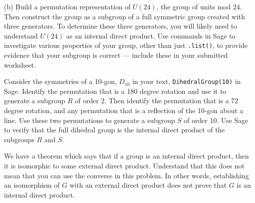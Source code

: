 %
(b) Build a permutation representation of $U(24)$, the group of units mod 24.  Then construct the group as a subgroup of a full symmetric group created with three generators.  To determine these three generators, you will likely need to understand $U(24)$ as an internal direct product.  Use commands in Sage to investigate various properties of your group, other than just \verb?.list()?, to provide evidence that your subgroup is correct --- include these in your submitted worksheet.
\begin{sageverbatim}\end{sageverbatim}
%
%
Consider the symmetries of a 10-gon, $D_{10}$ in your text, \verb?DihedralGroup(10)? in Sage.  Identify the permutation that is a 180 degree rotation and use it to generate a subgroup $R$ of order 2.  Then identify the permutation that is a 72 degree rotation, and any permutation that is a reflection of the 10-gon about a line.  Use these two permutations to generate a subgroup $S$ of order 10.  Use Sage to verify that the full dihedral group is the internal direct product of the subgroups $R$ and $S$.\par
%
We have a theorem which says that if a group is an internal direct product, then it is isomorphic to some external direct product.  Understand that this does not mean that you can use the converse in this problem.  In other words, establishing an isomorphism of $G$ with an external direct product does not prove that $G$ is an internal direct product.
\begin{sageverbatim}\end{sageverbatim}
%
